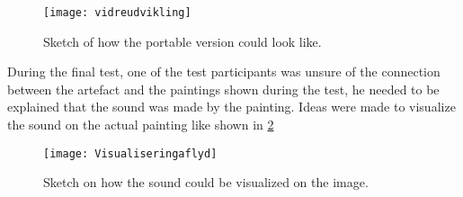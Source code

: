 \begin{figure}[!h] 
\centering
\texttt{[image: vidreudvikling]}
\caption{\label{fig:vidreudvikling} Sketch of how the portable version could look like.}
\end{figure}



During the final test, one of the test participants was unsure of the connection between the artefact and the paintings shown during the test, he needed to be explained that the sound was made by the painting. Ideas were made to visualize the sound on the actual painting like shown in \ref{fig:Visualiseringaflyd} 

\begin{figure}[!h] 
\centering
\texttt{[image: Visualiseringaflyd]}
\caption{\label{fig:Visualiseringaflyd} Sketch on how the sound could be visualized on the image.}
\end{figure}
  
